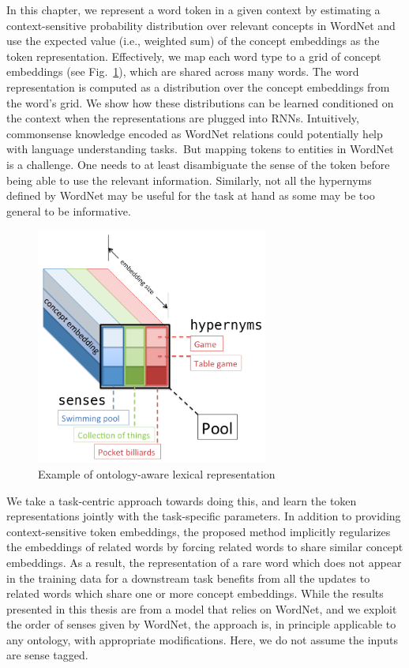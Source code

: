 In this chapter, we represent a word token in a given context by estimating a 
context-sensitive probability distribution over relevant concepts in WordNet 
\citep{miller1995wordnet} and use the expected value (i.e., weighted sum) of the 
concept embeddings as the token representation.
Effectively, we map each word type to a grid of concept embeddings (see 
Fig.~\ref{fig:ontolstm_tensor}), which are shared across many words. The word 
representation is computed as a distribution over the concept embeddings from 
the word's grid. We show how these distributions can be 
learned conditioned on the context when the representations are plugged into 
RNNs.
Intuitively, commonsense knowledge encoded as WordNet relations could 
potentially help with language understanding tasks.\
But mapping tokens to entities in WordNet is a challenge. One needs to at least 
disambiguate the sense of the token before being able to use the relevant 
information. Similarly, not all the hypernyms defined by WordNet may be useful 
for the task at hand as some may be too general to be informative.
 
\begin{figure}[t]
\begin{center}
\includegraphics[width=3in]{figures/tensor2.png}
\caption{Example of ontology-aware lexical representation}\label{fig:ontolstm_tensor}
\end{center}
\end{figure}

We take a task-centric approach towards doing this, and learn the token 
representations jointly with the task-specific parameters.
In addition to providing context-sensitive token embeddings, the proposed method 
implicitly regularizes the embeddings of related words by forcing related words 
to share similar concept embeddings. 
As a result, the representation of a rare word which does not appear in the 
training data for a downstream task benefits from all the updates to related 
words which share one or more concept embeddings. While the results presented in this thesis are from a model that relies on WordNet, 
and we exploit the order of senses given by WordNet, the approach is, in principle 
applicable to any ontology, with appropriate modifications. Here, we do not assume the inputs are 
sense tagged.

